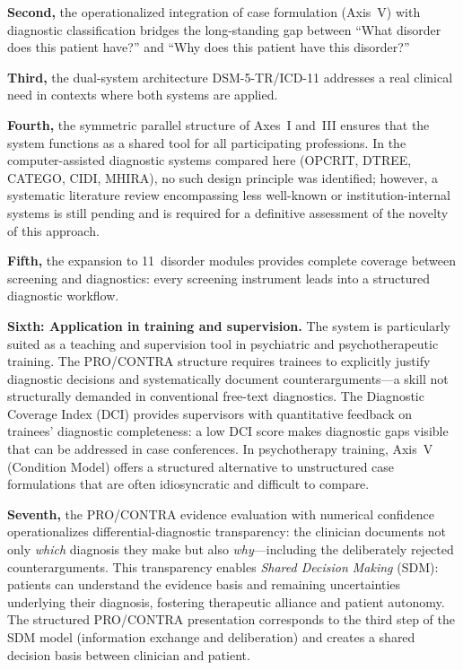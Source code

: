 \documentclass[11pt,a4paper]{article}
\begin{document}
\textbf{Second,} the operationalized integration of case formulation (Axis~V) with diagnostic classification bridges the long-standing gap between ``What disorder does this patient have?'' and ``Why does this patient have this disorder?''

\textbf{Third,} the dual-system architecture DSM-5-TR/ICD-11 addresses a real clinical need in contexts where both systems are applied.

\textbf{Fourth,} the symmetric parallel structure of Axes~I and~III ensures that the system functions as a shared tool for all participating professions. In the computer-assisted diagnostic systems compared here (OPCRIT, DTREE, CATEGO, CIDI, MHIRA), no such design principle was identified; however, a systematic literature review encompassing less well-known or institution-internal systems is still pending and is required for a definitive assessment of the novelty of this approach.

\textbf{Fifth,} the expansion to 11~disorder modules provides complete coverage between screening and diagnostics: every screening instrument leads into a structured diagnostic workflow.

\textbf{Sixth: Application in training and supervision.} The system is particularly suited as a teaching and supervision tool in psychiatric and psychotherapeutic training. The PRO/CONTRA structure requires trainees to explicitly justify diagnostic decisions and systematically document counterarguments---a skill not structurally demanded in conventional free-text diagnostics. The Diagnostic Coverage Index (DCI) provides supervisors with quantitative feedback on trainees' diagnostic completeness: a low DCI score makes diagnostic gaps visible that can be addressed in case conferences. In psychotherapy training, Axis~V (Condition Model) offers a structured alternative to unstructured case formulations that are often idiosyncratic and difficult to compare.

\textbf{Seventh,} the PRO/CONTRA evidence evaluation with numerical confidence operationalizes differential-diagnostic transparency: the clinician documents not only \textit{which} diagnosis they make but also \textit{why}---including the deliberately rejected counterarguments. This transparency enables \textit{Shared Decision Making} (SDM): patients can understand the evidence basis and remaining uncertainties underlying their diagnosis, fostering therapeutic alliance and patient autonomy. The structured PRO/CONTRA presentation corresponds to the third step of the SDM model (information exchange and deliberation) and creates a shared decision basis between clinician and patient.
\end{document}
